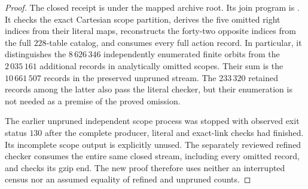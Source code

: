\begin{proof}
The closed receipt is
 under the
mapped  archive root.
Its join program is .
It checks the exact Cartesian scope partition, derives
the five omitted right indices from their literal maps,
reconstructs the forty-two opposite indices from the full
$228$-table catalog, and consumes every full action record.
In particular, it distinguishes the $8\,626\,346$ independently
enumerated finite orbits from the $2\,035\,161$ additional
records in analytically omitted scopes.  Their sum is the
$10\,661\,507$ records in the preserved unpruned stream.
The $233\,320$ retained records among the latter also pass
the literal checker, but their enumeration is not needed
as a premise of the proved omission.

The earlier unpruned independent scope process was stopped
with observed exit status $130$ after the complete producer,
literal and exact-link checks had finished.  Its incomplete
scope output is explicitly unused.  The separately reviewed
refined checker consumes the entire same closed stream,
including every omitted record, and checks its gzip end.
The new proof therefore uses neither an interrupted census
nor an assumed equality of refined and unpruned counts.
\end{proof}
